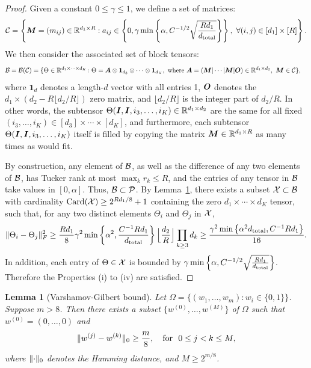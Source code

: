 \documentclass{article}
\theoremstyle{plain}
\newtheorem{lem}{Lemma}
\theoremstyle{definition}
\begin{document}
\begin{proof}
Given a constant $0\leq \gamma \leq 1$, we define a set of matrices:
\[
\mathcal{C}=\left\{\bm M=(m_{ij})\in\mathbb{R}^{d_1\times R}: a_{ij}\in \left\{ 0,\gamma \min\left\{ \alpha , C^{-1/2}\sqrt{Rd_1\over d_{\text{total}}} \right\}\right\} ,\  \forall (i,j)\in[d_1]\times[R]\right\}.
\]
We then consider the associated set of block tensors:
\begin{align}
\mathcal{B}=\mathcal{B}(\mathcal{C})=\{\Theta\in\mathbb{R}^{d_1\times \cdots \times d_K}\colon& \Theta=\bm A\otimes \mathbf{1}_{d_3}\otimes \cdots \otimes \mathbf{1}_{d_K}, \ \text{where}\ \bm A=(\bm M|\cdots|\bm M|\bm{O}) \in\mathbb{R}^{d_1\times d_2},\ \bm M\in\mathcal{C}\},
\end{align}
where $\mathbf{1}_d$ denotes a length-$d$ vector with all entries 1, $\bm{O}$ denotes the $d_1\times (d_2-R\lfloor d_2/R \rfloor)$ zero matrix, and $\lfloor d_2/ R \rfloor$ is the integer part of $d_2/R$. In other words, the subtensor $\Theta(\bm I, \bm I,i_3, \ldots,i_K)\in\mathbb{R}^{d_1\times d_2}$ are the same for all fixed $(i_3,\ldots,i_K)\in[d_3]\times \cdots \times [d_K]$, and furthermore, each subtensor $\Theta(\bm I,\bm I, i_3,\ldots,i_K)$ itself is filled by copying the matrix $\bm M\in\mathbb{R}^{d_1\times R}$ as many times as would fit.

By construction, any element of $\mathcal{B}$, as well as the difference of any two elements of $\mathcal{B}$, has Tucker rank at most $\max_k r_k\leq R$, and the entries of any tensor in $\mathcal{B}$ take values in $[0,\alpha]$. Thus, $\mathcal{B}\subset\mathcal{P}$. By Lemma~\ref{lem:VGbound}, there exists a subset $\mathcal{X}\subset \mathcal{B}$ with cardinality $\text{Card}(\mathcal{X})\geq 2^{Rd_1/8}+1$ containing the zero $d_1\times \cdots \times d_K$ tensor, such that, for any two distinct elements $\Theta_i$ and $\Theta_j$ in $\mathcal{X}$,
\[
\lVert\Theta_i-\Theta_j\rVert_F^2 \geq {Rd_1\over 8} \gamma^2\min\left\{ \alpha^2, {C^{-1}Rd_1 \over d_{\text{total}}}\right\} \Big\lfloor {d_2\over R}\Big \rfloor \prod_{k\geq 3}d_k\geq {\gamma^2\min\left\{ \alpha^2 d_{\text{total}}, C^{-1}Rd_1\right\}  \over 16}.
\]
In addition, each entry of $\Theta\in\mathcal{X}$ is bounded by $\gamma \min\left\{ \alpha , C^{-1/2}\sqrt{Rd_1\over d_{\text{total}}}\right\} $. Therefore the Properties (i) to (iv) are satisfied.
\end{proof}



\begin{lem}[Varshamov-Gilbert bound]\label{lem:VGbound}
Let $\Omega=\{(w_1,\ldots,w_m)\colon w_i\in\{0,1\}\}$. Suppose $m>8$. Then there exists a subset $\{w^{(0)},\ldots,w^{(M)}\}$ of $\Omega$ such that $w^{(0)}=(0,\ldots,0)$ and
\[
\lVert w^{(j)}-w^{(k)}\rVert_0\geq {m\over 8},\quad \text{for } \ 0\leq j<k\leq M,
\]
where $\lVert\cdot\rVert_0$ denotes the Hamming distance, and $M\geq 2^{m/8}$.
\end{lem}
\end{document}
